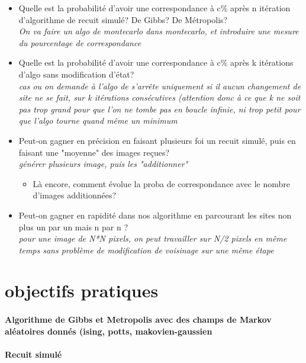\documentclass[fleqn]{article} %
\begin{document}
\begin{itemize}
	\item Quelle est la probabilité d'avoir une correspondance à c\% après n itération d'algorithme de recuit simulé? De Gibbs? De Métropolis? \\
		\textit{On va faire un algo de montecarlo dans montecarlo, et introduire une mesure du pourcentage de correspondance}
	\item Quelle est la probabilité d'avoir une correspondance à c\% après k itérations d'algo sans modification d'état?\\
		\textit{cas ou on demande à l'algo de s'arrête uniquement si il aucun changement de site ne se fait, sur k itérations consécutives (attention donc à ce que k ne soit pas trop grand pour que l'on ne tombe pas en boucle infinie, ni trop petit pour que l'algo tourne quand même un minimum}
	\item Peut-on gagner en précision en faisant plusieurs foi un recuit simulé, puis en faisant une "moyenne" des images reçues?\\
		\textit{générer plusieurs image, puis les "additionner"}\\
		\begin{itemize} \item Là encore, comment évolue la proba de correspondance avec le nombre d'images additionnées?	\end{itemize}
	\item Peut-on gagner en rapidité dans nos algorithme en parcourant les sites non plus un par un mais n par n ?\\
		\textit{pour une image de N*N pixels, on peut travailler sur N/2 pixels en même temps sans problème de modification de voisinage sur une même étape}
\end{itemize}




\section{objectifs pratiques}
\paragraph{Algorithme de Gibbs et Metropolis avec des champs de Markov aléatoires donnés (ising, potts, makovien-gaussien}
\paragraph{Recuit simulé}
\end{document}
